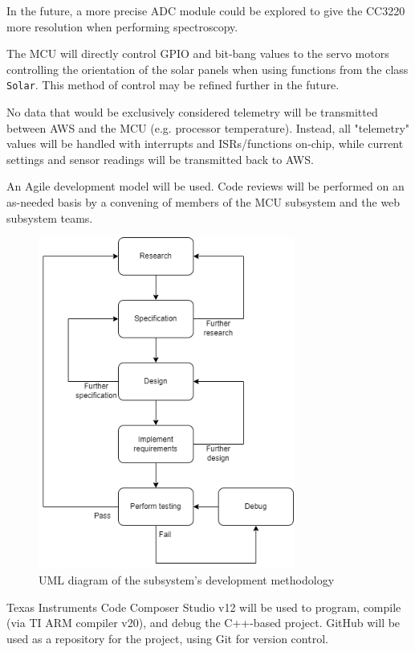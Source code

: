 \begin{flushleft}
    In the future, a more precise ADC module could be explored to give the
    CC3220 more resolution when performing spectroscopy.
\end{flushleft}
\begin{flushleft}
    The MCU will directly control GPIO and bit-bang values to the servo motors
    controlling the orientation of the solar panels when using functions from
    the class \texttt{Solar}. This method of control may be refined further in
    the future.
\end{flushleft}
\begin{flushleft}
    No data that would be exclusively considered telemetry will be transmitted 
    between AWS and the MCU (e.g. processor temperature). Instead, all
    "telemetry" values will be handled with interrupts and ISRs/functions
    on-chip, while current settings and sensor readings will be transmitted
    back to AWS.
\end{flushleft}
\begin{flushleft}
    An Agile development model will be used. Code reviews will be performed on
    an as-needed basis by a convening of members of the MCU subsystem and the
    web subsystem teams.
    \begin{figure}[H]
        \caption{UML diagram of the subsystem's development methodology}
        \label{mcu_agile_uml}
        \centering
        \includegraphics[width=0.75\textwidth]{images/mcu_agile_uml.png}
    \end{figure}
\end{flushleft}
\begin{flushleft}
    Texas Instruments Code Composer Studio v12 will be used to program,
    compile (via TI ARM compiler v20), and debug the C++-based project. GitHub
    will be used as a repository for the project, using Git for version
    control.
\end{flushleft}